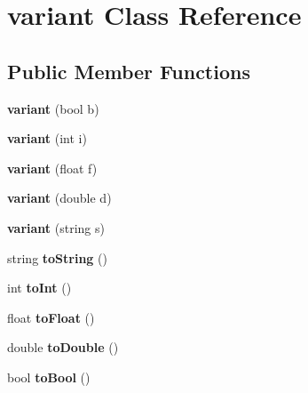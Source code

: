 \hypertarget{classvariant}{}\section{variant Class Reference}
\label{classvariant}
\subsection*{Public Member Functions}
\begin{DoxyCompactItemize}
\item 
\mbox{\label{classvariant_a5b49efae87706c3958517fb698d1602c}} 
{\bfseries variant} (bool b)
\item 
\mbox{\label{classvariant_a0b1676baf8573b80258242a2063253ae}} 
{\bfseries variant} (int i)
\item 
\mbox{\label{classvariant_a8dfda99f9b0eec143b07fcee23b1a680}} 
{\bfseries variant} (float f)
\item 
\mbox{\label{classvariant_a0558af69dbe089581864a0df6dcb5a84}} 
{\bfseries variant} (double d)
\item 
\mbox{\label{classvariant_aff363357b1569624df8bc85cf370cdf2}} 
{\bfseries variant} (string s)
\item 
\mbox{\label{classvariant_ad74681bf3e38aa54812e0eacee040db3}} 
string {\bfseries to\+String} ()
\item 
\mbox{\label{classvariant_a46a0ced3004e4d950ae3f9da54736036}} 
int {\bfseries to\+Int} ()
\item 
\mbox{\label{classvariant_a1f0417302a0451df449467538d863a7a}} 
float {\bfseries to\+Float} ()
\item 
\mbox{\label{classvariant_a1d36cfdc414ebe1b529f4aeaf7c2f887}} 
double {\bfseries to\+Double} ()
\item 
\mbox{\label{classvariant_a9056d8647bad204121e0486d9a32ff38}} 
bool {\bfseries to\+Bool} ()
\end{DoxyCompactItemize}
